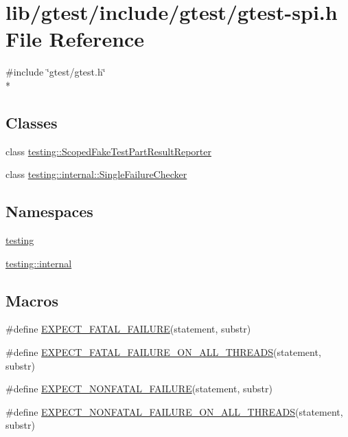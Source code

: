 \hypertarget{gtest-spi_8h}{\section{lib/gtest/include/gtest/gtest-\/spi.h File Reference}
\label{gtest-spi_8h}
}
{\ttfamily \#include \char`\"{}gtest/gtest.\-h\char`\"{}}\\*
\subsection*{Classes}
\begin{DoxyCompactItemize}
\item 
class \hyperlink{classtesting_1_1_scoped_fake_test_part_result_reporter}{testing\-::\-Scoped\-Fake\-Test\-Part\-Result\-Reporter}
\item 
class \hyperlink{classtesting_1_1internal_1_1_single_failure_checker}{testing\-::internal\-::\-Single\-Failure\-Checker}
\end{DoxyCompactItemize}
\subsection*{Namespaces}
\begin{DoxyCompactItemize}
\item 
\hyperlink{namespacetesting}{testing}
\item 
\hyperlink{namespacetesting_1_1internal}{testing\-::internal}
\end{DoxyCompactItemize}
\subsection*{Macros}
\begin{DoxyCompactItemize}
\item 
\#define \hyperlink{gtest-spi_8h_a819a3fd7f8b8cf24b6f1b3a26708973d}{E\-X\-P\-E\-C\-T\-\_\-\-F\-A\-T\-A\-L\-\_\-\-F\-A\-I\-L\-U\-R\-E}(statement, substr)
\item 
\#define \hyperlink{gtest-spi_8h_ad8aac5bc859b2ddc07583636ae4f45cf}{E\-X\-P\-E\-C\-T\-\_\-\-F\-A\-T\-A\-L\-\_\-\-F\-A\-I\-L\-U\-R\-E\-\_\-\-O\-N\-\_\-\-A\-L\-L\-\_\-\-T\-H\-R\-E\-A\-D\-S}(statement, substr)
\item 
\#define \hyperlink{gtest-spi_8h_a8376fd6821bd88fd806697355e79e138}{E\-X\-P\-E\-C\-T\-\_\-\-N\-O\-N\-F\-A\-T\-A\-L\-\_\-\-F\-A\-I\-L\-U\-R\-E}(statement, substr)
\item 
\#define \hyperlink{gtest-spi_8h_a9f4cf1f150fe9facfc4cbf0bae646ee9}{E\-X\-P\-E\-C\-T\-\_\-\-N\-O\-N\-F\-A\-T\-A\-L\-\_\-\-F\-A\-I\-L\-U\-R\-E\-\_\-\-O\-N\-\_\-\-A\-L\-L\-\_\-\-T\-H\-R\-E\-A\-D\-S}(statement, substr)
\end{DoxyCompactItemize}


